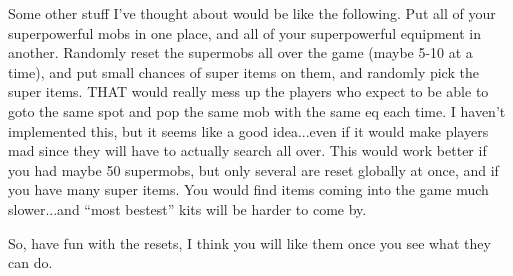 Some other stuff I've thought about would be like the following. Put
all of your superpowerful mobs in one place, and all of your
superpowerful equipment in another. Randomly reset the supermobs all
over the game (maybe 5-10 at a time), and put small chances of super
items on them, and randomly pick the super items. THAT would really
mess up the players who expect to be able to goto the same spot
and pop the same mob with the same eq each time. I haven't implemented
this, but it seems like a good idea...even if it would make players
mad since they will have to actually search all over. This would
work better if you had maybe 50 supermobs, but only several are 
reset globally at once, and if you have many super items. You would find
items coming into the game much slower...and ``most bestest'' kits
will be harder to come by. 

So, have fun with the resets, I think you will like them once you
see what they can do.

